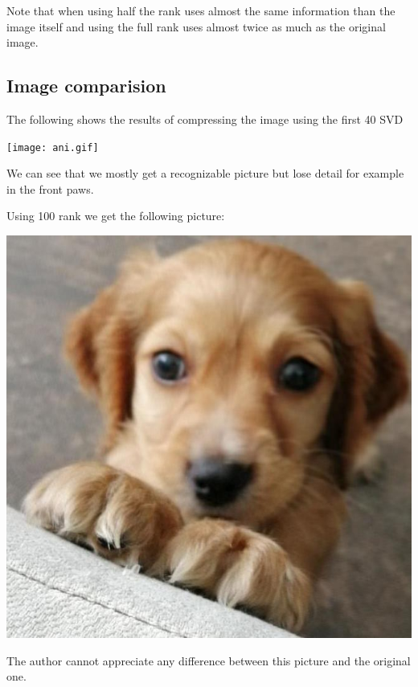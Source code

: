 \documentclass[
]{article}
\begin{document}
Note that when using half the rank uses almost the same information than
the image itself and using the full rank uses almost twice as much as
the original image.

\hypertarget{image-comparision}{%
\subsection{Image comparision}\label{image-comparision}}

The following shows the results of compressing the image using the first
40 SVD

\texttt{[image: ani.gif]}

We can see that we mostly get a recognizable picture but lose detail for
example in the front paws.

Using 100 rank we get the following picture:

\includegraphics{blipf100.jpg}

The author cannot appreciate any difference between this picture and the
original one.
\end{document}
